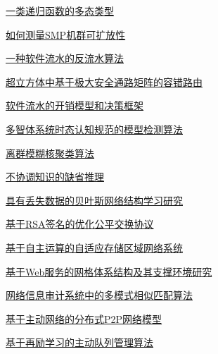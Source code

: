 \documentclass[a4paper]{article}
\begin{document}
\href{http://www.jos.org.cn/ch/reader/download_pdf.aspx?file_no=20040703&year_id=2004&quarter_id=7&falg=1}{一类递归函数的多态类型}

\href{http://www.jos.org.cn/ch/reader/download_pdf.aspx?file_no=20040704&year_id=2004&quarter_id=7&falg=1}{如何测量SMP机群可扩放性}

\href{http://www.jos.org.cn/ch/reader/download_pdf.aspx?file_no=20040705&year_id=2004&quarter_id=7&falg=1}{一种软件流水的反流水算法}

\href{http://www.jos.org.cn/ch/reader/download_pdf.aspx?file_no=20040706&year_id=2004&quarter_id=7&falg=1}{超立方体中基于极大安全通路矩阵的容错路由}

\href{http://www.jos.org.cn/ch/reader/download_pdf.aspx?file_no=20040707&year_id=2004&quarter_id=7&falg=1}{软件流水的开销模型和决策框架}

\href{http://www.jos.org.cn/ch/reader/download_pdf.aspx?file_no=20040708&year_id=2004&quarter_id=7&falg=1}{多智体系统时态认知规范的模型检测算法}

\href{http://www.jos.org.cn/ch/reader/download_pdf.aspx?file_no=20040709&year_id=2004&quarter_id=7&falg=1}{离群模糊核聚类算法}

\href{http://www.jos.org.cn/ch/reader/download_pdf.aspx?file_no=20040710&year_id=2004&quarter_id=7&falg=1}{不协调知识的缺省推理}

\href{http://www.jos.org.cn/ch/reader/download_pdf.aspx?file_no=20040711&year_id=2004&quarter_id=7&falg=1}{具有丢失数据的贝叶斯网络结构学习研究}

\href{http://www.jos.org.cn/ch/reader/download_pdf.aspx?file_no=20040712&year_id=2004&quarter_id=7&falg=1}{基于RSA签名的优化公平交换协议}

\href{http://www.jos.org.cn/ch/reader/download_pdf.aspx?file_no=20040713&year_id=2004&quarter_id=7&falg=1}{基于自主运算的自适应存储区域网络系统}

\href{http://www.jos.org.cn/ch/reader/download_pdf.aspx?file_no=20040714&year_id=2004&quarter_id=7&falg=1}{基于Web服务的网格体系结构及其支撑环境研究}

\href{http://www.jos.org.cn/ch/reader/download_pdf.aspx?file_no=20040715&year_id=2004&quarter_id=7&falg=1}{网络信息审计系统中的多模式相似匹配算法}

\href{http://www.jos.org.cn/ch/reader/download_pdf.aspx?file_no=20040716&year_id=2004&quarter_id=7&falg=1}{基于主动网络的分布式P2P网络模型}

\href{http://www.jos.org.cn/ch/reader/download_pdf.aspx?file_no=20040717&year_id=2004&quarter_id=7&falg=1}{基于再励学习的主动队列管理算法}
\end{document}
